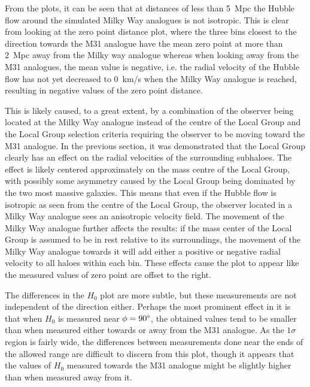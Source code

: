 \documentclass[english, oneside]{HYgradu}
\begin{document}
From the plots, it can be seen that at distances of less than 5~Mpc the Hubble flow around the simulated Milky Way analogues is not isotropic. This is clear from looking at the zero point distance plot, where the three bins closest to the direction towards the M31 analogue have the mean zero point at more than 2~Mpc away from the Milky way analogue whereas when looking away from the M31 analogues, the mean value is negative, i.e. the radial velocity of the Hubble flow has not yet decreased to 0~km/s when the Milky Way analogue is reached, resulting in negative values of the zero point distance.

This is likely caused, to a great extent, by a combination of the observer being located at the Milky Way analogue instead of the centre of the Local Group and the Local Group selection criteria requiring the observer to be moving toward the M31 analogue. In the previous section, it was demonstrated that the Local Group clearly has an effect on the radial velocities of the surrounding subhaloes. The effect is likely centered approximately on the mass centre of the Local Group, with possibly some asymmetry caused by the Local Group being dominated by the two most massive galaxies. This means that even if the Hubble flow is isotropic as seen from the centre of the Local Group, the observer located in a Milky Way analogue sees an anisotropic velocity field.
The movement of the Milky Way analogue further affects the results: if the mass center of the Local Group is assumed to be in rest relative to its surroundings, the movement of the Milky Way analogue towards it will add either a positive or negative radial velocity to all haloes within each bin. These effects cause the plot to appear like the measured values of zero point are offset to the right.

The differences in the $H_0$ plot are more subtle, but these measurements are not independent of the direction either. Perhaps the most prominent effect in it is that when $H_0$ is measured near $\phi = 90\degree$, the obtained values tend to be smaller than when measured either towards or away from the M31 analogue. As the $1 \sigma$ region is fairly wide, the differences between measurements done near the ends of the allowed range are difficult to discern from this plot, though it appears that the values of $H_0$ measured towards the M31 analogue might be slightly higher than when measured away from it.
\end{document}
